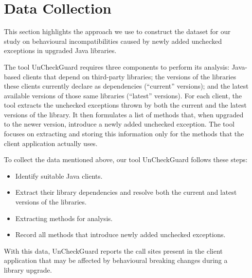 \chapter{Data Collection}\label{data}

This section highlights the approach we use to construct the dataset for our study on behavioural incompatibilities caused by newly added unchecked exceptions in upgraded Java libraries.


The tool UnCheckGuard requires three components to perform its analysis: Java-based clients that depend on third-party libraries; the versions of the libraries these clients currently declare as dependencies (“current” versions); and the latest available versions of those same libraries (“latest” versions). For each client, the tool extracts the unchecked exceptions thrown by both the current and the latest versions of the library. It then formulates a list of methods that, when upgraded to the newer version, introduce a newly added unchecked exception. The tool focuses on extracting and storing this information only for the methods that the client application actually uses.


To collect the data mentioned above, our tool UnCheckGuard follows these steps:
\begin{itemize}
    \item Identify suitable Java clients.
    \item Extract their library dependencies and resolve both the current and latest versions of the libraries.
    \item Extracting methods for analysis.
    \item Record all methods that introduce newly added unchecked exceptions.
\end{itemize}
With this data, UnCheckGuard reports the call sites present in the client application that may be affected by behavioural breaking changes during a library upgrade.

